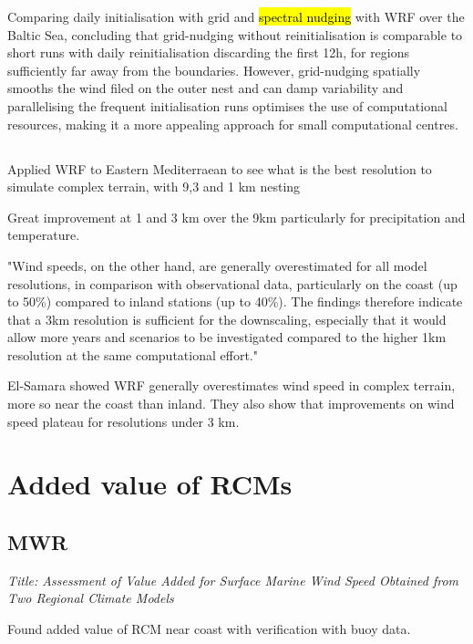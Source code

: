 \documentclass[12pt,a4paper]{article}
\begin{document}
Comparing daily initialisation with grid and \hl{spectral nudging} with WRF over the Baltic Sea, concluding that grid-nudging without reinitialisation is comparable to short runs with daily reinitialisation discarding the first 12h, for regions sufficiently far away from the boundaries. However, grid-nudging spatially smooths the wind filed on the outer nest and can damp variability and parallelising the frequent initialisation runs optimises the use of computational resources, making it a more appealing approach for small computational centres.

\subsection{\cite{El-Samra2018}}

Applied WRF to Eastern Mediterraean to see what is the best resolution to simulate complex terrain, with 9,3 and 1 km nesting

Great improvement at 1 and 3 km over the 9km particularly for precipitation and temperature. 

"Wind speeds, on the other hand, are generally overestimated for all model resolutions, in comparison with observational data, particularly on the coast (up to 50\%) compared to inland stations (up to 40\%). The findings therefore indicate that a 3km resolution is sufficient for the downscaling, especially that it would allow more years and scenarios to be investigated compared to the higher 1km resolution at the same computational effort."

El-Samara showed WRF generally overestimates wind speed in complex terrain, more so near the coast than inland. They also show that improvements on wind speed plateau for resolutions under 3 km.



\section{Added value of RCMs}

\subsection{\cite{Winterfeldt2009} MWR}

\textit{Title: Assessment of Value Added for Surface Marine Wind Speed Obtained from Two Regional Climate Models}

Found added value of RCM near coast with verification with buoy data.
\end{document}
